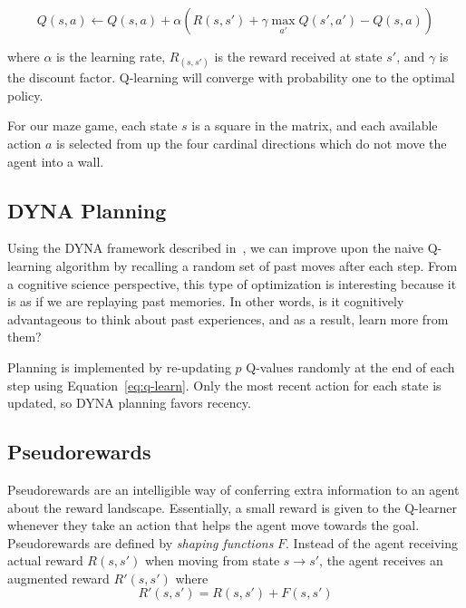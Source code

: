 \documentclass[notitlepage]{article}
\begin{document}
\begin{equation}
Q(s,a) \leftarrow Q(s,a) + \alpha (R(s, s') + \gamma \max_{a'} Q(s', a') - Q(s,a))
\label{eq:q-learn}
\end{equation}

where $\alpha$ is the learning rate, $R_(s, s')$ is the reward received at state $s'$, and $\gamma$ is the discount factor. Q-learning will converge with probability one to the optimal policy. 

For our maze game, each state $s$ is a square in the matrix, and each available action $a$ is selected from up the four cardinal directions which do not move the agent into a wall. 

\subsection*{DYNA Planning}

Using the DYNA framework described in~\cite{sutton1998reinforcement}, we can improve upon the naive Q-learning algorithm by recalling a random set of past moves after each step. From a cognitive science perspective, this type of optimization is interesting because it is as if we are replaying past memories. In other words, is it cognitively advantageous to think about past experiences, and as a result, learn more from them? 

Planning is implemented by re-updating $p$ Q-values randomly at the end of each step using Equation~\ref{eq:q-learn}. Only the most recent action for each state is updated, so DYNA planning favors recency.

\subsection*{Pseudorewards}

Pseudorewards are an intelligible way of conferring extra information to an agent about the reward landscape. Essentially, a small reward is given to the Q-learner whenever they take an action that helps the agent move towards the goal. Pseudorewards are defined by \textit{shaping functions} $F$. Instead of the agent receiving actual reward $R(s, s')$ when moving from state $s \rightarrow s'$, the agent receives an augmented reward $R'(s, s')$ where
\begin{equation}
R'(s, s') = R(s, s') + F(s, s')
\end{equation} 
\end{document}
